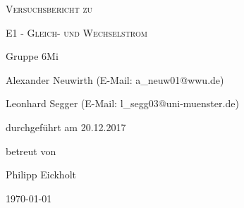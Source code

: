 \documentclass[
	a4paper,
	12pt,
	pagesize,
	ngerman
]{scrartcl}
\begin{document}
	
	\begin{titlepage}
		\centering
		{\scshape\LARGE Versuchsbericht zu \par}
		\vspace{1cm}
		{\scshape\huge E1 - Gleich- und Wechselstrom\par}
		\vspace{2.5cm}
		{\LARGE Gruppe 6Mi \par}
		\vspace{0.5cm}
		
		{\large Alexander Neuwirth (E-Mail: a\_neuw01@wwu.de) \par}
		{\large Leonhard Segger (E-Mail: l\_segg03@uni-muenster.de) \par}
		\vfill
		
		durchgeführt am 20.12.2017\par 
		betreut von\par
		{\large Philipp Eickholt}            
		
		\vfill
		
		{\large \today\par}
	\end{titlepage}
	\tableofcontents
	\newpage
\end{document}
